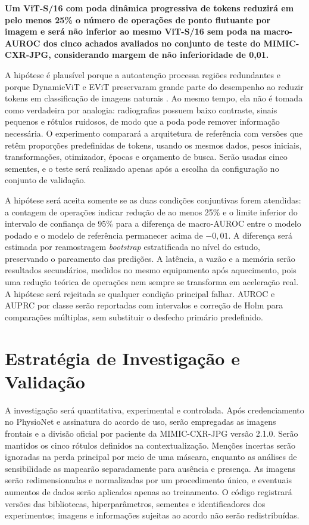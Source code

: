 \documentclass[10pt,a4paper]{extarticle}
\begin{document}
\textbf{Um ViT-S/16 com poda dinâmica progressiva de tokens reduzirá em pelo menos 25\% o número de operações de ponto flutuante por imagem e será não inferior ao mesmo ViT-S/16 sem poda na macro-AUROC dos cinco achados avaliados no conjunto de teste do MIMIC-CXR-JPG, considerando margem de não inferioridade de 0,01.}

A hipótese é plausível porque a autoatenção processa regiões redundantes e porque DynamicViT e EViT preservaram grande parte do desempenho ao reduzir tokens em classificação de imagens naturais \citep{rao2021dynamicvit,liang2022evit}. Ao mesmo tempo, ela não é tomada como verdadeira por analogia: radiografias possuem baixo contraste, sinais pequenos e rótulos ruidosos, de modo que a poda pode remover informação necessária. O experimento comparará a arquitetura de referência com versões que retêm proporções predefinidas de tokens, usando os mesmos dados, pesos iniciais, transformações, otimizador, épocas e orçamento de busca. Serão usadas cinco sementes, e o teste será realizado apenas após a escolha da configuração no conjunto de validação.

A hipótese será aceita somente se as duas condições conjuntivas forem atendidas: a contagem de operações indicar redução de ao menos 25\% e o limite inferior do intervalo de confiança de 95\% para a diferença de macro-AUROC entre o modelo podado e o modelo de referência permanecer acima de $-0{,}01$. A diferença será estimada por reamostragem \emph{bootstrap} estratificada no nível do estudo, preservando o pareamento das predições. A latência, a vazão e a memória serão resultados secundários, medidos no mesmo equipamento após aquecimento, pois uma redução teórica de operações nem sempre se transforma em aceleração real. A hipótese será rejeitada se qualquer condição principal falhar. AUROC e AUPRC por classe serão reportadas com intervalos e correção de Holm para comparações múltiplas, sem substituir o desfecho primário predefinido.

\section{Estratégia de Investigação e Validação}

A investigação será quantitativa, experimental e controlada. Após credenciamento no PhysioNet e assinatura do acordo de uso, serão empregadas as imagens frontais e a divisão oficial por paciente da MIMIC-CXR-JPG versão 2.1.0. Serão mantidos os cinco rótulos definidos na contextualização. Menções incertas serão ignoradas na perda principal por meio de uma máscara, enquanto as análises de sensibilidade as mapearão separadamente para ausência e presença. As imagens serão redimensionadas e normalizadas por um procedimento único, e eventuais aumentos de dados serão aplicados apenas ao treinamento. O código registrará versões das bibliotecas, hiperparâmetros, sementes e identificadores dos experimentos; imagens e informações sujeitas ao acordo não serão redistribuídas.
\end{document}
